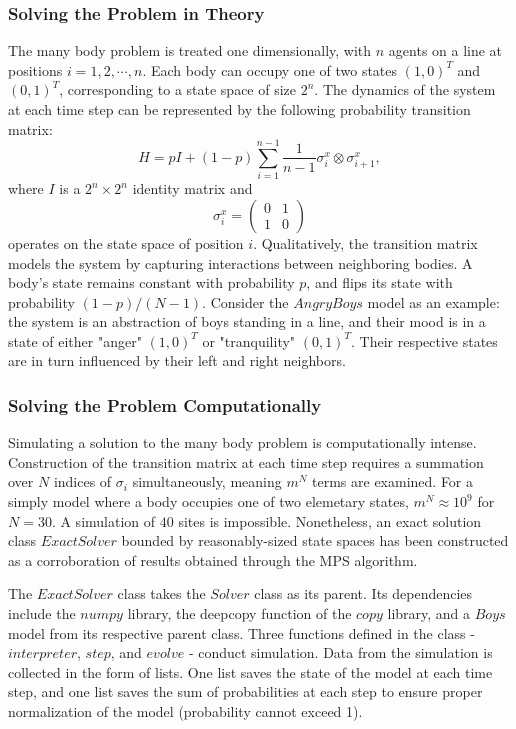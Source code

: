 \documentclass[english]{article}
\begin{document}
\subsubsection{Solving the Problem in Theory}
	The many body problem is treated one dimensionally, with $n$ agents on a line at positions $i=1,2,\cdots,n$. Each body can occupy one of two states $(1,0)^T$ and $(0,1)^T$, corresponding to a state space of size $2^n$. The dynamics of the system at each time step can be represented by the following probability transition matrix:
\begin{displaymath}
H = pI + (1-p)\sum_{i=1}^{n-1}\frac{1}{n-1}\sigma_i^x\otimes\sigma_{i+1}^x,
\end{displaymath}
where $I$ is a $2^n\times2^n$ identity matrix and
\begin{displaymath}
\sigma_i^x =
\begin{pmatrix}
0 & 1 \\
1 & 0
\end{pmatrix}
\end{displaymath}
operates on the state space of position $i$.  Qualitatively, the transition matrix models the system by capturing interactions between neighboring bodies. A body's state remains constant with probability $p$, and flips its state with probability  $(1-p)/(N-1)$. Consider the $Angry Boys$ model as an example: the system is an abstraction of boys standing in a line, and their mood is in a state of either  "anger" $(1,0)^T$ or "tranquility" $(0,1)^T$. Their respective states are in turn influenced by their left and right neighbors.

\subsubsection{Solving the Problem Computationally}
	Simulating a solution to the many body problem is computationally intense. Construction of the transition matrix at each time step requires a summation over $N$ indices of $\sigma_{i}$
simultaneously, meaning $m^{N}$ terms are examined. For a simply model where a body occupies one of two elemetary states, $m^{N}\approx10^{9}$ for $N=30$. A simulation of $40$ sites is impossible.  Nonetheless, an exact solution class $ExactSolver$ bounded by reasonably-sized state spaces has been constructed as a corroboration of results obtained through the MPS algorithm.

The $ExactSolver$ class takes the $Solver$ class as its parent. Its dependencies include the $numpy$ library, the deepcopy function of the $copy$ library, and a $Boys$ model from its respective parent class. Three functions defined in the class - $interpreter$, $step$, and $evolve$ - conduct simulation. Data from the simulation is collected in the form of lists. One list saves the state of the model at each time step, and one list saves the sum of probabilities at each step to ensure proper normalization of the model (probability cannot exceed 1).
\end{document}
